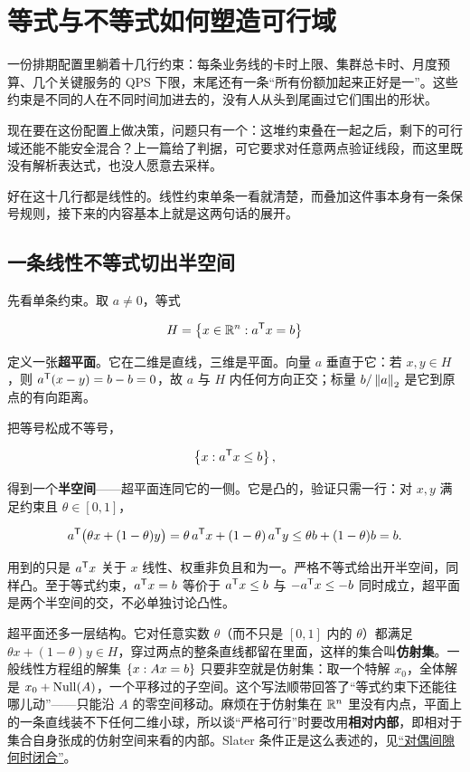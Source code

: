 \section{等式与不等式如何塑造可行域}
\label{sec:09-Convex-Optimization/02-Convex-Sets/02}

一份排期配置里躺着十几行约束：每条业务线的卡时上限、集群总卡时、月度预算、几个关键服务的 QPS 下限，末尾还有一条``所有份额加起来正好是一''。这些约束是不同的人在不同时间加进去的，没有人从头到尾画过它们围出的形状。

现在要在这份配置上做决策，问题只有一个：这堆约束叠在一起之后，剩下的可行域还能不能安全混合？上一篇给了判据，可它要求对任意两点验证线段，而这里既没有解析表达式，也没人愿意去采样。

好在这十几行都是线性的。线性约束单条一看就清楚，而叠加这件事本身有一条保号规则，接下来的内容基本上就是这两句话的展开。

\subsection{一条线性不等式切出半空间}

先看单条约束。取 \(a\ne0\)，等式

\[
H=\left\{x\in\mathbb{R}^n: a^{\mathsf{T}}x=b\right\}
\]

定义一张\textbf{超平面}。它在二维是直线，三维是平面。向量 \(a\) 垂直于它：若 \(x,y\in H\)，则 \(a^{\mathsf{T}}(x-y)=b-b=0\)，故 \(a\) 与 \(H\) 内任何方向正交；标量 \(b/\left\lVert a\right\rVert_2\) 是它到原点的有向距离。

把等号松成不等号，

\[
\left\{x:a^{\mathsf{T}}x\le b\right\},
\]

得到一个\textbf{半空间}——超平面连同它的一侧。它是凸的，验证只需一行：对 \(x,y\) 满足约束且 \(\theta\in[0,1]\)，

\[
a^{\mathsf{T}}\bigl(\theta x+(1-\theta)y\bigr)=\theta\,a^{\mathsf{T}}x+(1-\theta)\,a^{\mathsf{T}}y\le\theta b+(1-\theta)b=b.
\]

用到的只是 \(a^{\mathsf{T}}x\) 关于 \(x\) 线性、权重非负且和为一。严格不等式给出开半空间，同样凸。至于等式约束，\(a^{\mathsf{T}}x=b\) 等价于 \(a^{\mathsf{T}}x\le b\) 与 \(-a^{\mathsf{T}}x\le-b\) 同时成立，超平面是两个半空间的交，不必单独讨论凸性。

超平面还多一层结构。它对任意实数 \(\theta\)（而不只是 \([0,1]\) 内的 \(\theta\)）都满足 \(\theta x+(1-\theta)y\in H\)，穿过两点的整条直线都留在里面，这样的集合叫\textbf{仿射集}。一般线性方程组的解集 \(\left\{x:Ax=b\right\}\) 只要非空就是仿射集：取一个特解 \(x_0\)，全体解是 \(x_0+\operatorname{Null}(A)\)，一个平移过的子空间。这个写法顺带回答了``等式约束下还能往哪儿动''——只能沿 \(A\) 的零空间移动。麻烦在于仿射集在 \(\mathbb{R}^n\) 里没有内点，平面上的一条直线装不下任何二维小球，所以谈``严格可行''时要改用\textbf{相对内部}，即相对于集合自身张成的仿射空间来看的内部。Slater 条件正是这么表述的，见\hyperref[sec:09-Convex-Optimization/05-Duality/02]{``对偶间隙何时闭合''}。

